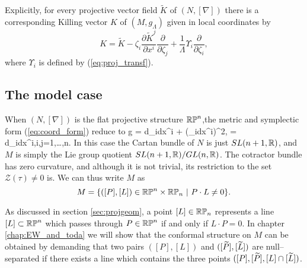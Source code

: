 Explicitly, for every projective vector field $\tilde{K}$ of $(N,[\nabla])$
there is a corresponding Killing vector $K$ of $(M,g_{\Lambda})$
given in local coordinates by 
\begin{equation}
{K}=\tilde{K}-\zeta_{i}\frac{\partial \tilde{K}^{j}}{\partial x^{i}}\frac{\partial}{\partial \zeta_{j}}+\frac{1}{\Lambda}\Upsilon_{i}\frac{\partial}{\partial \zeta_{i}},\label{eq:kvf_from_pvf}
\end{equation}
where $\Upsilon_{i}$ is defined by (\ref{eq:proj_transf}).

\subsection{The model case} \label{sec:intro_model}
When $(N,[\nabla])$ is the flat projective structure $\mathbb{RP}^n$,the metric and symplectic form (\ref{eq:coord_form}) reduce to
\be \label{eq:intro_model_g}
g = d\zeta_i\odot dx^i + (\zeta_idx^i)^2, \quad \Omega = d\zeta_i\wedge dx^i,\quad i,j=1,\dots,n.
\ee
In this case the Cartan bundle of $N$ is just $SL(n+1,\mathbb{R})$, and $M$ is simply the Lie group quotient $SL(n+1,\mathbb{R})/GL(n,\mathbb{R})$. The cotractor bundle has zero curvature, and although it is not trivial, its restriction to the set $\mathcal{Z}(\tau)\neq 0$ is. %
We can thus write $M$ as
\[
M=\{([P],[L])\in\RP^n\times\RP_n\ |\ P\cdot L\neq 0\}.
\]

As discussed in section \ref{sec:projgeom}, a point $[L]\in\mathbb{RP}_n$ represents a line $[L]\subset\mathbb{RP}^n$ which passes through $P\in\mathbb{RP}^n$ if and only if $L\cdot P=0$. In chapter \ref{chap:EW_and_toda} we will show that the conformal structure on $M$ can be obtained by demanding that two pairs $([P], [L])$ and $([\widetilde{P}], [\widetilde{L}])$ are null--separated if there exists a line which contains the three points $([P], [\widetilde{P}], [L]\cap [\widetilde{L}])$. 

